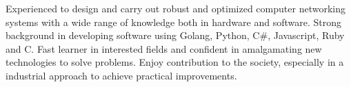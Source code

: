 

\begin{cvparagraph}

Experienced to design and carry out robust and optimized computer networking systems with a wide range of knowledge both in hardware and software.
Strong background in developing software using Golang, Python, C\#, Javascript, Ruby and C.
Fast learner in interested fields and confident in amalgamating new technologies to solve problems.
Enjoy contribution to the society, especially in a industrial approach to achieve practical improvements.

\end{cvparagraph}
